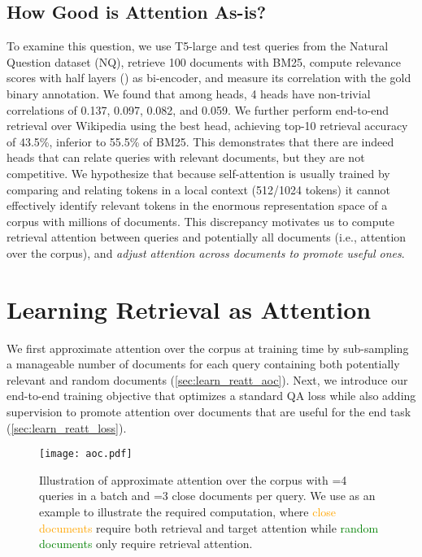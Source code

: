 \documentclass[11pt, dvipsnames]{article}
\begin{document}
\subsection{How Good is Attention As-is?}\label{sec:reatt_asis}
To examine this question, we use T5-large and test queries from the Natural Question dataset (NQ), retrieve 100 documents with BM25, compute relevance scores  with half layers () as bi-encoder, and measure its correlation with the gold binary annotation.
We found that among  heads, 4 heads have non-trivial correlations of 0.137, 0.097, 0.082, and 0.059.
We further perform end-to-end retrieval over Wikipedia using the best head, achieving top-10 retrieval accuracy of 43.5\%, inferior to 55.5\% of BM25.
This demonstrates that there are indeed heads that can relate queries with relevant documents, but they are not competitive.
We hypothesize that because self-attention is usually trained by comparing and relating tokens in a local context (512/1024 tokens) it cannot effectively identify relevant tokens in the enormous representation space of a corpus with millions of documents.
This discrepancy motivates us to compute retrieval attention between queries and potentially all documents (i.e., attention over the corpus), and \emph{adjust attention across documents to promote useful ones}.

\section{Learning Retrieval as Attention}\label{sec:learn_reatt}
We first approximate attention over the corpus at training time by sub-sampling a manageable number of documents for each query containing both potentially relevant and random documents (\autoref{sec:learn_reatt_aoc}).
Next, we introduce our end-to-end training objective that optimizes a standard QA loss while also adding supervision to promote attention over documents that are useful for the end task (\autoref{sec:learn_reatt_loss}).

\begin{figure}[tb]
\texttt{[image: aoc.pdf]}
\centering
\caption{Illustration of approximate attention over the corpus with =4 queries in a batch and =3 close documents per query. We use  as an example to illustrate the required computation, where \textcolor{Orange}{close documents} require both retrieval and target attention while \textcolor{Green}{random documents} only require retrieval attention.}
\label{fig:aoc}
\end{figure}
\end{document}
